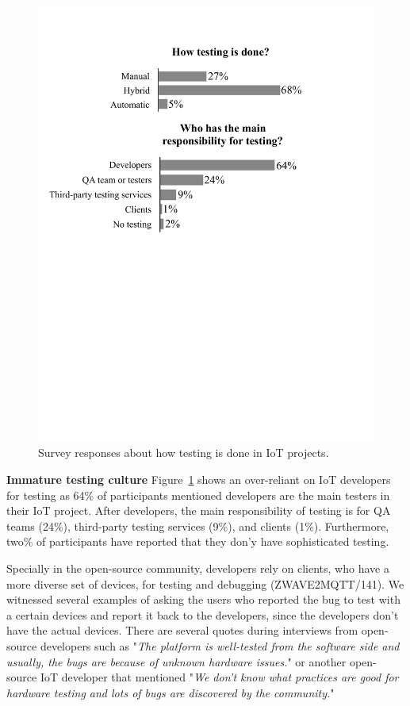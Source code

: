 { \begin{figure}%
  \centering
   \includegraphics[width=\linewidth]{imgs/testing.pdf}
  \caption{Survey responses about how testing is done in IoT projects.
  }
  \label{fig:testing}
\end{figure}



\textbf{Immature testing culture}
Figure~\ref{fig:testing} shows an over-reliant on IoT developers for testing as 64\% of participants mentioned developers are the main testers in their IoT project. After developers, the main responsibility of testing is for QA teams (24\%), third-party testing services (9\%), and clients (1\%). Furthermore, two\% of participants have reported that they don'y have sophisticated testing.

Specially in the open-source community, developers rely on clients, who have a more diverse set of devices, for testing and debugging (ZWAVE2MQTT/141). We witnessed several examples of asking the users who reported the bug to test with a certain devices and report it back to the developers, since the developers don't have the actual devices. There are several quotes during interviews from open-source developers such as "\emph{The platform is well-tested from the software side and usually, the bugs are because of unknown hardware issues.}" or another open-source IoT developer that mentioned "\emph{We don't know what practices are good for hardware testing and lots of bugs are discovered by the community.}"

}
